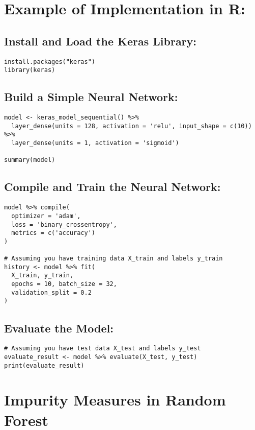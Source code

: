\documentclass{article}
\begin{document}
\section{Example of Implementation in R:}

\subsection{Install and Load the Keras Library:}
\begin{verbatim}
install.packages("keras")
library(keras)
\end{verbatim}

\subsection{Build a Simple Neural Network:}
\begin{verbatim}
model <- keras_model_sequential() %>%
  layer_dense(units = 128, activation = 'relu', input_shape = c(10)) %>%
  layer_dense(units = 1, activation = 'sigmoid')

summary(model)
\end{verbatim}

\subsection{Compile and Train the Neural Network:}
\begin{verbatim}
model %>% compile(
  optimizer = 'adam',
  loss = 'binary_crossentropy',
  metrics = c('accuracy')
)

# Assuming you have training data X_train and labels y_train
history <- model %>% fit(
  X_train, y_train,
  epochs = 10, batch_size = 32,
  validation_split = 0.2
)
\end{verbatim}

\subsection{Evaluate the Model:}
\begin{verbatim}
# Assuming you have test data X_test and labels y_test
evaluate_result <- model %>% evaluate(X_test, y_test)
print(evaluate_result)
\end{verbatim}


\section{Impurity Measures in Random Forest}
\end{document}

